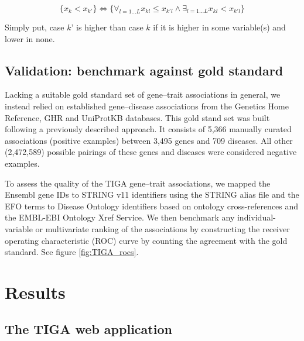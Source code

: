 \begin{equation}
    \{ x_k < x_{k'} \} \Leftrightarrow \{ \forall_{l=1...L} x_{kl} \leq x_{k'l} \wedge \exists_{l=1...L} x_{kl} < x_{k'l} \}
\end{equation}


Simply put, case $k$’ is higher than case $k$ if it is higher in some variable(s) and lower in none.

\subsection{Validation: benchmark against gold standard}

Lacking a suitable gold standard set of gene–trait associations in general, we instead relied on established gene–disease associations from the Genetics Home Reference, GHR\cite{Fomous2006-wm} and UniProtKB\cite{UniProt_Consortium2018-kq} databases. This gold stand set was built following a previously described approach\cite{Pletscher-Frankild2015-oo}. It consists of 5,366 manually curated associations (positive examples) between 3,495 genes and 709 diseases. All other (2,472,589) possible pairings of these genes and diseases were considered negative examples.

To assess the quality of the TIGA gene–trait associations, we mapped the Ensembl gene IDs to STRING v11 identifiers using the STRING alias file\cite{Szklarczyk2019-bc} and the EFO terms to Disease Ontology\cite{Schriml2019-uh} identifiers based on ontology cross-references and the EMBL-EBI Ontology Xref Service. We then benchmark any individual-variable or multivariate ranking of the associations by constructing the receiver operating characteristic (ROC) curve by counting the agreement with the gold standard. See figure \ref{fig:TIGA_rocs}.

\section{Results}

\subsection{The TIGA web application}

